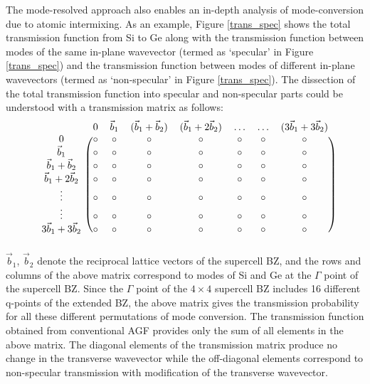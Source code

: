 \documentclass[11pt]{article}
\begin{document}
The mode-resolved approach also enables an in-depth analysis of mode-conversion due to atomic intermixing. As an example, Figure \ref{trans_spec} shows the total transmission function from Si to Ge along with the transmission function between modes of the same in-plane wavevector (termed as `specular' in Figure \ref{trans_spec}) and the transmission function between modes of different in-plane wavevectors (termed as `non-specular' in Figure \ref{trans_spec}). The dissection of the total transmission function into specular and non-specular parts could be understood with a transmission matrix as follows:
\begin{equation}
\begin{blockarray}{cccccccc}
{} & 0 & \vec{b}_1 & (\vec{b}_1+\vec{b}_2) & (\vec{b}_1+2\vec{b}_2) & \dots & \dots & (3\vec{b}_1+3\vec{b}_2)\\
\begin{block}{c(ccccccc)}
  0 & \circ & \circ & \circ & \circ & \circ & \circ & \circ \\
  \vec{b}_1 & \circ & \circ & \circ & \circ & \circ & \circ & \circ \\
  \vec{b}_1+\vec{b}_2 & \circ & \circ & \circ & \circ & \circ & \circ & \circ \\
  \vec{b}_1+2\vec{b}_2 & \circ & \circ & \circ & \circ & \circ & \circ & \circ \\
  \vdots & \circ & \circ & \circ & \circ & \circ & \circ & \circ \\
  \vdots & \circ & \circ & \circ & \circ & \circ & \circ & \circ \\
  3\vec{b}_1+3\vec{b}_2 & \circ & \circ & \circ & \circ & \circ & \circ & \circ \\
\end{block}
\end{blockarray}
\label{trans_matrix}
\end{equation}
$\vec{b}_1$, $\vec{b}_2$ denote the reciprocal lattice vectors of the supercell BZ, and the rows and columns of the above matrix correspond to modes of Si and Ge at the $\Gamma$ point of the supercell BZ. Since the $\Gamma$ point of the $4\times4$ supercell BZ includes 16 different q-points of the extended BZ, the above matrix gives the transmission probability for all these different permutations of mode conversion. The transmission function obtained from conventional AGF provides only the sum of all elements in the above matrix. The diagonal elements of the transmission matrix produce no change in the transverse wavevector while the off-diagonal elements correspond to non-specular transmission with modification of the transverse wavevector. 
\end{document}
